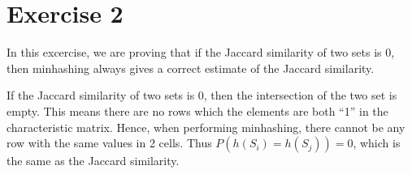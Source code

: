 \section*{Exercise 2}
In this excercise, we are proving that if the Jaccard similarity of two sets is 0, then minhashing always gives a correct estimate of the Jaccard similarity.

If the Jaccard similarity of two sets is 0, then the intersection of the two set is empty. This means there are no rows which the elements are both ``1'' in the 
characteristic matrix. Hence, when performing minhashing, there cannot be any row with the same values in 2 cells. Thus $P(h(S_i) = h(S_j)) = 0$, which is the same as the Jaccard similarity. 


